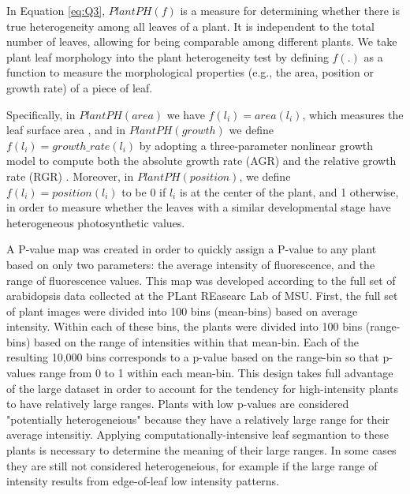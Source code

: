 \documentclass{bioinfo}
\begin{document}
\begin{methods}
In Equation \ref{eq:Q3}, $PlantPH(f)$ is a measure for determining whether there is true heterogeneity among all leaves of a plant. It is independent to the total number of leaves, allowing for being comparable among different plants. We take plant leaf morphology into the plant heterogeneity test by defining $f(.)$ as a function to measure the morphological properties (e.g., the area, position or growth rate) of a piece of leaf.

Specifically, in $PlantPH(area)$ we have $f(l_i)=area(l_i)$, which measures the leaf surface area \citep{boyes2001growth,tessmer2013functional}, and in $PlantPH(growth)$ we define $f(l_i)=growth\_rate(l_i)$ by adopting a three-parameter nonlinear growth model to compute both the absolute growth rate (AGR) and the relative growth rate (RGR) \citep{Richards1959,hunt1982plant,tessmer2013functional}. Moreover, in $PlantPH(position)$, we define $f(l_i)=position(l_i)$ to be 0 if $l_i$ is at the center of the plant, and 1 otherwise, in order to measure whether the leaves with a similar developmental stage have heterogeneous photosynthetic values.

A P-value map was created in order to quickly assign a P-value to any plant based on only two parameters: the average intensity of fluorescence, and the range of fluorescence values. This map was developed according to the full set of arabidopsis data collected at the PLant REasearc Lab of MSU. First, the full set of plant images were divided into 100 bins (mean-bins) based on average intensity. Within each of these bins, the plants were divided into 100 bins (range-bins) based on the range of intensities within that mean-bin. Each of the resulting 10,000 bins corresponds to a p-value based on the range-bin so that p-values range from 0 to 1 within each mean-bin. This design takes full advantage of the large dataset in order to account for the tendency for high-intensity plants to have relatively large ranges. Plants with low p-values are considered "potentially heterogeneious" because they have a relatively large range for their average intensitiy. Applying computationally-intensive leaf segmantion to these plants is necessary to determine the meaning of their large ranges. In some cases they are still not considered heterogeneious, for example if the large range of intensity results from edge-of-leaf low intensity patterns.



\end{methods}
\end{document}
